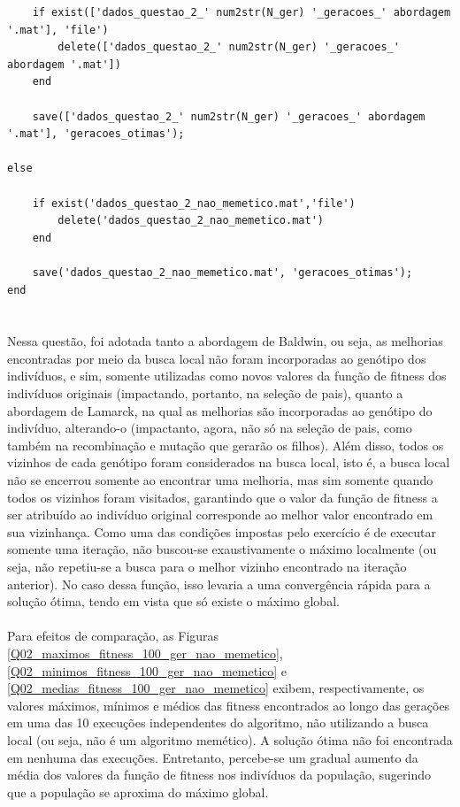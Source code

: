 \documentclass{report}
\begin{document}
\begin{lstlisting}
    if exist(['dados_questao_2_' num2str(N_ger) '_geracoes_' abordagem '.mat'], 'file')
        delete(['dados_questao_2_' num2str(N_ger) '_geracoes_' abordagem '.mat'])
    end
    
    save(['dados_questao_2_' num2str(N_ger) '_geracoes_' abordagem '.mat'], 'geracoes_otimas');

else
    
    if exist('dados_questao_2_nao_memetico.mat','file')
        delete('dados_questao_2_nao_memetico.mat')
    end
    
    save('dados_questao_2_nao_memetico.mat', 'geracoes_otimas');
end
    

\end{lstlisting}

\paragraph{} Nessa questão, foi adotada tanto a abordagem de Baldwin, ou seja, as melhorias encontradas por meio da busca local não foram incorporadas ao genótipo dos indivíduos, e sim, somente utilizadas como novos valores da função de fitness dos indivíduos originais (impactando, portanto, na seleção de pais), quanto a abordagem de Lamarck, na qual as melhorias são incorporadas ao genótipo do indivíduo, alterando-o (impactanto, agora, não só na seleção de pais, como também na recombinação e mutação que gerarão os filhos). Além disso, todos os vizinhos de cada genótipo foram considerados na busca local, isto é, a busca local não se encerrou somente ao encontrar uma melhoria, mas sim somente quando todos os vizinhos foram visitados, garantindo que o valor da função de fitness a ser atribuído ao indivíduo original corresponde ao melhor valor encontrado em sua vizinhança. Como uma das condições impostas pelo exercício é de executar somente uma iteração, não buscou-se exaustivamente o máximo localmente (ou seja, não repetiu-se a busca para o melhor vizinho encontrado na iteração anterior). No caso dessa função, isso levaria a uma convergência rápida para a solução ótima, tendo em vista que só existe o máximo global.\\

\paragraph{} Para efeitos de comparação, as Figuras \ref{Q02_maximos_fitness_100_ger_nao_memetico}, \ref{Q02_minimos_fitness_100_ger_nao_memetico} e \ref{Q02_medias_fitness_100_ger_nao_memetico} exibem, respectivamente, os valores máximos, mínimos e médios das fitness encontrados ao longo das gerações em uma das 10 execuções independentes do algoritmo, não utilizando a busca local (ou seja, não é um algoritmo memético). A solução ótima não foi encontrada em nenhuma das execuções. Entretanto, percebe-se um gradual aumento da média dos valores da função de fitness nos indivíduos da população, sugerindo que a população se aproxima do máximo global.\\ 
\end{document}
